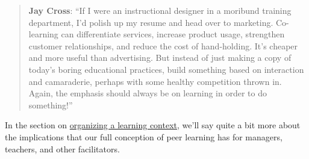 \begin{quote}
\textbf{Jay Cross}: ``If I were an instructional designer in a moribund
training department, I'd polish up my resume and head over to marketing.
Co-learning can differentiate services, increase product usage,
strengthen customer relationships, and reduce the cost of hand-holding.
It's cheaper and more useful than advertising. But instead of just
making a copy of today's boring educational practices, build something
based on interaction and camaraderie, perhaps with some healthy
competition thrown in. Again, the emphasis should always be on learning
in order to do something!''
\end{quote}
In the section on \href{http://peeragogy.org/organize/}{organizing a
learning context}, we'll say quite a bit more about the implications
that our full conception of peer learning has for managers, teachers,
and other facilitators.

